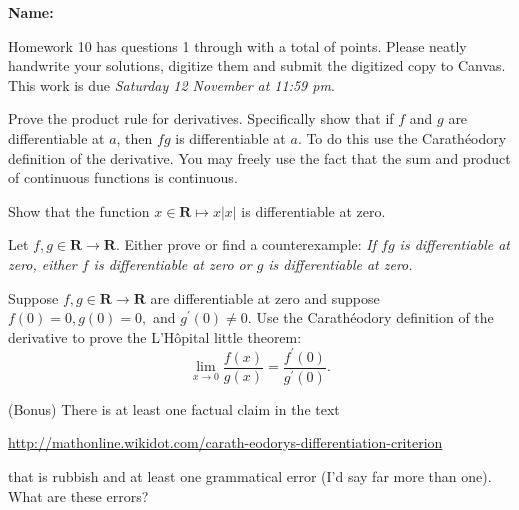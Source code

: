 \documentclass[12pt,fleqn]{exam}
\newcommand{\reals}{\mathbf{R}}
\newcommand\PM{{\sc pm}}
\newcommand{\quiz}{10}
\newcommand{\term}{Fall}
\newcommand{\due}{Saturday 12 November at 11:59 \PM}
\begin{document}
\large
\vspace{0.1in}
\noindent{}
{\bf Name:}  \\
\noindent \makebox[3.0truein][l]{\bf Homework \quiz, \term \/ \the\year}
\vspace{0.1in}

\begin{quote}
    \end{quote}
\noindent  Homework    \quiz\/  has questions 1 through  \numquestions \/ with 
a total of  \numpoints\/  points.  Please neatly handwrite your solutions, digitize them and
submit the digitized copy to Canvas. This work is due \emph{\due}.

\vspace{0.1in}


\begin{questions} 

\question[5] Prove the product rule for derivatives. Specifically show
that if $f$ and $g$ are differentiable at $a$, then $f g$ is
differentiable at $a$. To do this use the Carathéodory definition
of the derivative. You may freely use the fact that the sum and
product of continuous functions is continuous.

\begin{solution}
    
\end{solution}

\question[5] Show that the function $x \in \reals \mapsto x |x|$ is
differentiable at zero.

\question[5] Let $f,g \in \reals \to \reals$. Either prove or find a 
counterexample: \emph{If $fg$ is differentiable at zero, either $f$
is differentiable at zero or $g$
is differentiable at zero.}



\question[5] Suppose $f,g \in \reals \to \reals$ are differentiable
at zero and suppose $f(0) = 0, g(0) = 0,$ and $g^\prime(0) \neq 0$.
Use the Carathéodory definition of the derivative to prove the 
L'Hôpital little theorem:
\begin{equation*}
\lim_{x \to 0} \frac{f(x)}{g(x)} = \frac{f^\prime(0)}{g^\prime(0)}.
\end{equation*}

\question (Bonus) There is at least one factual claim in the text

\url{http://mathonline.wikidot.com/carath-eodorys-differentiation-criterion}

that is rubbish and at least one grammatical error (I'd say far more than
one). What are these errors?
\end{questions}
\end{document}
